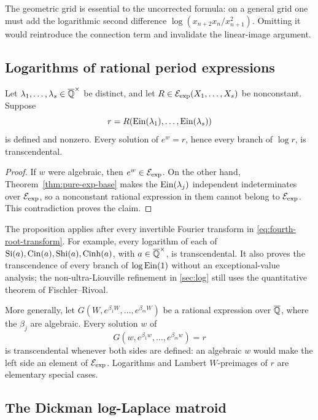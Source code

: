 The geometric grid is essential to the uncorrected formula: on a general
grid one must add the logarithmic second difference
\(\log(x_{n+2}x_n/x_{n+1}^2)\).  Omitting it would reintroduce the connection
term and invalidate the linear-image argument.

\subsection{Logarithms of rational period expressions}

\begin{proposition}
\label{prop:global-log-principle}
Let \(\lambda_1,\ldots,\lambda_s\in\overline{\mathbb Q}^\times\) be distinct, and let
\(R\in\mathcal E_{\mathrm{exp}}(X_1,\ldots,X_s)\) be nonconstant.  Suppose
\[
 r=R(\operatorname{Ein}(\lambda_1),\ldots,\operatorname{Ein}(\lambda_s))
\]
is defined and nonzero.  Every solution of \(e^w=r\), hence every branch of
\(\log r\), is transcendental.
\end{proposition}

\begin{proof}
If \(w\) were algebraic, then \(e^w\in\mathcal E_{\mathrm{exp}}\).  On the other hand,
Theorem~\ref{thm:pure-exp-base} makes the \(\operatorname{Ein}(\lambda_j)\) independent
indeterminates over \(\mathcal E_{\mathrm{exp}}\), so a nonconstant rational expression in
them cannot belong to \(\mathcal E_{\mathrm{exp}}\).  This contradiction proves the claim.
\end{proof}

The proposition applies after every invertible Fourier transform in
\eqref{eq:fourth-root-transform}.  For example, every logarithm of each of
\(\operatorname{Si}(a),\operatorname{Cin}(a),\operatorname{Shi}(a),\operatorname{Cinh}(a)\), with
\(a\in\overline{\mathbb Q}^\times\), is transcendental.  It also proves the transcendence
of every branch of \(\log\operatorname{Ein}(1)\) without an exceptional-value analysis;
the non-ultra-Liouville refinement in \cref{sec:log} still uses the
quantitative theorem of Fischler--Rivoal.

More generally, let
\(G(W,e^{\beta_1W},\ldots,e^{\beta_mW})\) be a rational expression over
\(\overline{\mathbb Q}\), where the \(\beta_j\) are algebraic.  Every solution \(w\) of
\[
 G(w,e^{\beta_1w},\ldots,e^{\beta_mw})=r
\]
is transcendental whenever both sides are defined: an algebraic \(w\)
would make the left side an element of \(\mathcal E_{\mathrm{exp}}\).  Logarithms and Lambert
\(W\)-preimages of \(r\) are elementary special cases.

\subsection{The Dickman log-Laplace matroid}

